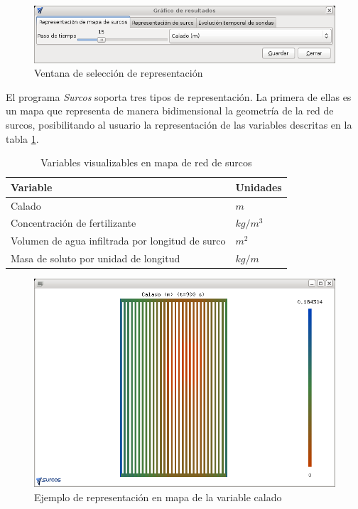 \begin{figure}[!h]
\begin{center}
\includegraphics*[width=\textwidth]{images/menuRepres.png}
\qquad
\caption{Ventana de selección de representación}\label{barraRepres}
\end{center}
\end{figure}

El programa \emph{Surcos} soporta tres tipos de representación. La primera de ellas es un mapa que representa de manera bidimensional la geometría de la red de surcos, posibilitando al usuario la representación de las variables descritas en la tabla \ref{tableVariablesMapa}.

\begin{table}[h]\footnotesize
\begin{center}
\begin{tabular}{ll}
\hline
Variable & Unidades \\
\hline
Calado & $m$ \\
Concentración de fertilizante & $ kg/m^3 $\\
Volumen de agua infiltrada por longitud de surco & $ m^2 $ \\
Masa de soluto por unidad de longitud & $ kg/m $ \\
\hline
\end{tabular}
\end{center}
  \caption{Variables visualizables en mapa de red de surcos}\label{tableVariablesMapa}
\end{table}

\begin{figure}[!h]
\begin{center}
\includegraphics*[width=\textwidth]{images/evo1.png}
\qquad
\caption{Ejemplo de representación en mapa de la variable calado}\label{evo1}
\end{center}
\end{figure}

